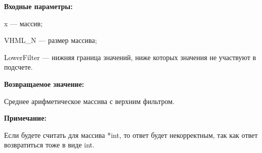 \textbf{Входные параметры:}

 x --- массив;
 
 VHML\_N --- размер массива;
 
 LowerFilter --- нижняя граница значений, ниже которых значения не участвуют в подсчете.

\textbf{Возвращаемое значение:}

 Среднее арифметическое массива с верхним фильтром.
 
\textbf{Примечание:}

Если будете считать для массива *int, то ответ будет некорректным, так как ответ возвратиться тоже в виде int.
 
